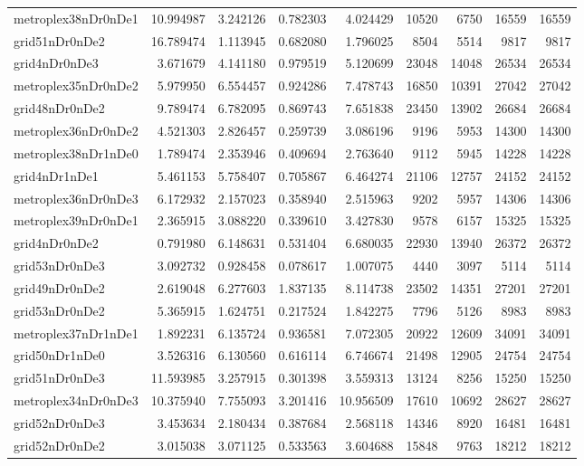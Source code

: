 \begin{longtable}{|l|r|r|r|r|r|r|r|r|}
metroplex38nDr0nDe1 & 10.994987 & 3.242126 & 0.782303 & 4.024429 & 10520 & 6750 & 16559 & 16559 \\
grid51nDr0nDe2 & 16.789474 & 1.113945 & 0.682080 & 1.796025 & 8504 & 5514 & 9817 & 9817 \\
grid4nDr0nDe3 & 3.671679 & 4.141180 & 0.979519 & 5.120699 & 23048 & 14048 & 26534 & 26534 \\
metroplex35nDr0nDe2 & 5.979950 & 6.554457 & 0.924286 & 7.478743 & 16850 & 10391 & 27042 & 27042 \\
grid48nDr0nDe2 & 9.789474 & 6.782095 & 0.869743 & 7.651838 & 23450 & 13902 & 26684 & 26684 \\
metroplex36nDr0nDe2 & 4.521303 & 2.826457 & 0.259739 & 3.086196 & 9196 & 5953 & 14300 & 14300 \\
metroplex38nDr1nDe0 & 1.789474 & 2.353946 & 0.409694 & 2.763640 & 9112 & 5945 & 14228 & 14228 \\
grid4nDr1nDe1 & 5.461153 & 5.758407 & 0.705867 & 6.464274 & 21106 & 12757 & 24152 & 24152 \\
metroplex36nDr0nDe3 & 6.172932 & 2.157023 & 0.358940 & 2.515963 & 9202 & 5957 & 14306 & 14306 \\
metroplex39nDr0nDe1 & 2.365915 & 3.088220 & 0.339610 & 3.427830 & 9578 & 6157 & 15325 & 15325 \\
grid4nDr0nDe2 & 0.791980 & 6.148631 & 0.531404 & 6.680035 & 22930 & 13940 & 26372 & 26372 \\
grid53nDr0nDe3 & 3.092732 & 0.928458 & 0.078617 & 1.007075 & 4440 & 3097 & 5114 & 5114 \\
grid49nDr0nDe2 & 2.619048 & 6.277603 & 1.837135 & 8.114738 & 23502 & 14351 & 27201 & 27201 \\
grid53nDr0nDe2 & 5.365915 & 1.624751 & 0.217524 & 1.842275 & 7796 & 5126 & 8983 & 8983 \\
metroplex37nDr1nDe1 & 1.892231 & 6.135724 & 0.936581 & 7.072305 & 20922 & 12609 & 34091 & 34091 \\
grid50nDr1nDe0 & 3.526316 & 6.130560 & 0.616114 & 6.746674 & 21498 & 12905 & 24754 & 24754 \\
grid51nDr0nDe3 & 11.593985 & 3.257915 & 0.301398 & 3.559313 & 13124 & 8256 & 15250 & 15250 \\
metroplex34nDr0nDe3 & 10.375940 & 7.755093 & 3.201416 & 10.956509 & 17610 & 10692 & 28627 & 28627 \\
grid52nDr0nDe3 & 3.453634 & 2.180434 & 0.387684 & 2.568118 & 14346 & 8920 & 16481 & 16481 \\
grid52nDr0nDe2 & 3.015038 & 3.071125 & 0.533563 & 3.604688 & 15848 & 9763 & 18212 & 18212 \\

\end{longtable}
